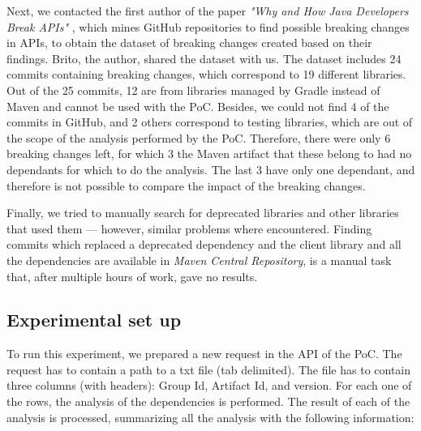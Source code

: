 Next, we contacted the first author of the paper \textit{"Why and How Java Developers Break APIs"} \cite{Brito2018}, which mines GitHub repositories to find possible breaking changes in APIs, to obtain the dataset of breaking changes created based on their findings. Brito, the author, shared the dataset with us. The dataset includes 24 commits containing breaking changes, which correspond to 19 different libraries. Out of the 25 commits, 12 are from libraries managed by Gradle instead of Maven and cannot be used with the PoC. Besides, we could not find 4 of the commits in GitHub, and 2 others correspond to testing libraries, which are out of the scope of the analysis performed by the PoC. Therefore, there were only 6 breaking changes left, for which 3 the Maven artifact that these belong to had no dependants for which to do the analysis. The last 3 have only one dependant, and therefore is not possible to compare the impact of the breaking changes.

Finally, we tried to manually search for deprecated libraries and other libraries that used them — however, similar problems where encountered. Finding commits which replaced a deprecated dependency and the client library and all the dependencies are available in \textit{Maven Central Repository}, is a manual task that, after multiple hours of work, gave no results.


\subsection{Experimental set up}
To run this experiment, we prepared a new request in the API of the PoC. The request has to contain a path to a txt file (tab delimited). The file has to contain three columns (with headers): Group Id, Artifact Id, and version. For each one of the rows, the analysis of the dependencies is performed. The result of each of the analysis is processed, summarizing all the analysis with the following information:

